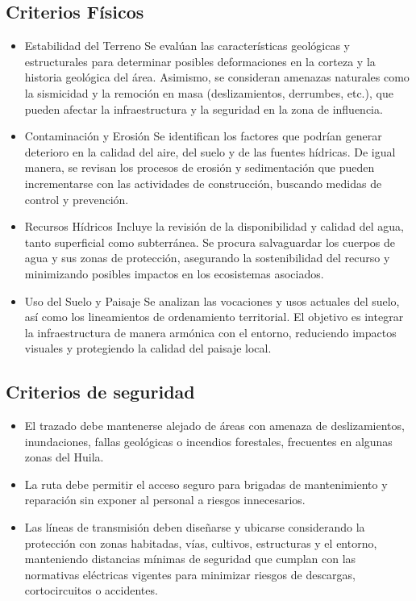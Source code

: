 \subsection{Criterios Físicos}
\begin{itemize}
    \item Estabilidad del Terreno
    \subitem Se evalúan las características geológicas y estructurales para determinar posibles deformaciones en la corteza y la historia geológica del área. Asimismo, se consideran amenazas naturales como la sismicidad y la remoción en masa (deslizamientos, derrumbes, etc.), que pueden afectar la infraestructura y la seguridad en la zona de influencia.
    \\
    \item Contaminación y Erosión
    \subitem Se identifican los factores que podrían generar deterioro en la calidad del aire, del suelo y de las fuentes hídricas. De igual manera, se revisan los procesos de erosión y sedimentación que pueden incrementarse con las actividades de construcción, buscando medidas de control y prevención.
    \\
    \item Recursos Hídricos
    \subitem Incluye la revisión de la disponibilidad y calidad del agua, tanto superficial como subterránea. Se procura salvaguardar los cuerpos de agua y sus zonas de protección, asegurando la sostenibilidad del recurso y minimizando posibles impactos en los ecosistemas asociados.
    \\
    \item Uso del Suelo y Paisaje
    \subitem Se analizan las vocaciones y usos actuales del suelo, así como los lineamientos de ordenamiento territorial. El objetivo es integrar la infraestructura de manera armónica con el entorno, reduciendo impactos visuales y protegiendo la calidad del paisaje local.
\end{itemize}
\subsection{Criterios de seguridad}
\begin{itemize}
    \item El trazado debe mantenerse alejado de áreas con amenaza de deslizamientos, inundaciones, fallas geológicas o incendios forestales, frecuentes en algunas zonas del Huila.
    
    \item La ruta debe permitir el acceso seguro para brigadas de mantenimiento y reparación sin exponer al personal a riesgos innecesarios.
    
    \item Las líneas de transmisión deben diseñarse y ubicarse considerando la protección con zonas habitadas, vías, cultivos, estructuras y el entorno, manteniendo distancias mínimas de seguridad que cumplan con las normativas eléctricas vigentes para minimizar riesgos de descargas, cortocircuitos o accidentes.
\end{itemize}

